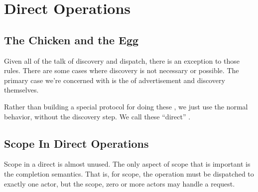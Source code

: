 \section{Direct Operations}

\label{ref:direct-ops}

\subsection{The Chicken and the Egg}

Given all of the talk of discovery and dispatch, there is an exception to those rules.  There are some cases where discovery is not necessary or possible.  The primary case we're concerned with is the \operations{} of advertisement and discovery themselves.

Rather than building a special protocol for doing these \operations, we just use the normal \operation{} behavior, without the discovery step.  We call these ``direct'' \operations{}.

\subsection{Scope In Direct Operations}


Scope in a direct \operation{} is almost unused.  The only aspect of scope that is important is the completion semantics.  That is, for \single{} scope, the operation must be dispatched to exactly one actor, but the \all{} scope, zero or more actors may handle a request.

